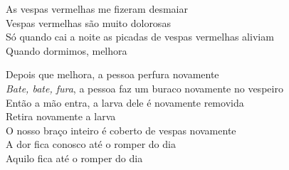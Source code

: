 \bigskip

\begin{linenumbers}\begingroup\raggedright
 
\noindent  As vespas vermelhas me fizeram desmaiar\\
 Vespas vermelhas são muito dolorosas\\
 Só quando cai a noite as picadas de vespas vermelhas aliviam\\
 Quando dormimos, melhora
 
\end{linenumbers}\endgroup

\bigskip

\begin{linenumbers}\begingroup\raggedright
 
\noindent  Depois que melhora, a pessoa perfura novamente\\
 \emph{Bate, bate, fura}, a pessoa faz um buraco novamente no vespeiro\\
 Então a mão entra, a larva dele é novamente removida\\
 Retira novamente a larva\\
 O nosso braço inteiro é coberto de vespas novamente\\
 A dor fica conosco até o romper do dia\\
 Aquilo fica até o romper do dia
 
\end{linenumbers}\endgroup

\bigskip

